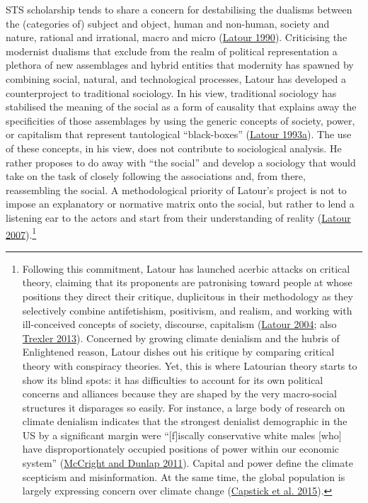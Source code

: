 \documentclass[a4paper, nobind]{templates/ociamthesis}
\begin{document}
STS scholarship tends to share a concern for destabilising the dualisms between the (categories of) subject and object, human and non-human, society and nature, rational and irrational, macro and micro (\protect\hyperlink{ref-latour_technology_1990}{Latour 1990}). Criticising the modernist dualisms that exclude from the realm of political representation a plethora of new assemblages and hybrid entities that modernity has spawned by combining social, natural, and technological processes, Latour has developed a counterproject to traditional sociology. In his view, traditional sociology has stabilised the meaning of the social as a form of causality that explains away the specificities of those assemblages by using the generic concepts of society, power, or capitalism that represent tautological ``black-boxes'' (\protect\hyperlink{ref-latour_we_1993}{Latour 1993a}). The use of these concepts, in his view, does not contribute to sociological analysis. He rather proposes to do away with ``the social'' and develop a sociology that would take on the task of closely following the associations and, from there, reassembling the social. A methodological priority of Latour's project is not to impose an explanatory or normative matrix onto the social, but rather to lend a listening ear to the actors and start from their understanding of reality (\protect\hyperlink{ref-latour_reassembling_2007}{Latour 2007}).\footnote{Following this commitment, Latour has launched acerbic attacks on critical theory, claiming that its proponents are patronising toward people at whose positions they direct their critique, duplicitous in their methodology as they selectively combine antifetishism, positivism, and realism, and working with ill-conceived concepts of society, discourse, capitalism (\protect\hyperlink{ref-latour_why_2004}{Latour 2004}; also \protect\hyperlink{ref-trexler_integrating_2013}{Trexler 2013}). Concerned by growing climate denialism and the hubris of Enlightened reason, Latour dishes out his critique by comparing critical theory with conspiracy theories. Yet, this is where Latourian theory starts to show its blind spots: it has difficulties to account for its own political concerns and alliances because they are shaped by the very macro-social structures it disparages so easily. For instance, a large body of research on climate denialism indicates that the strongest denialist demographic in the US by a significant margin were ``{[}f{]}iscally conservative white males {[}who{]} have disproportionately occupied positions of power within our economic system'' (\protect\hyperlink{ref-mccright_cool_2011}{McCright and Dunlap 2011}). Capital and power define the climate scepticism and misinformation. At the same time, the global population is largely expressing concern over climate change (\protect\hyperlink{ref-capstick_international_2015}{Capstick et al. 2015}).}
\end{document}
